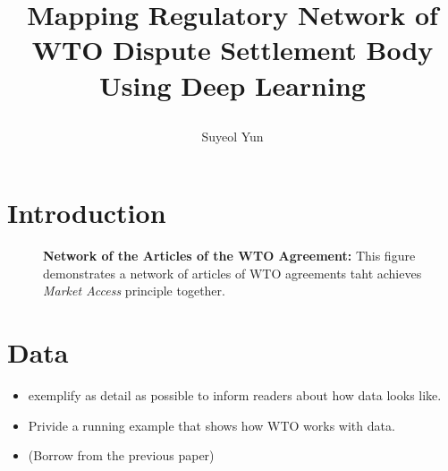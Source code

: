 \documentclass[12pt,letterpaper]{article}
\newcommand{\tit}{
\bf 
Mapping Regulatory Network of WTO Dispute Settlement Body Using Deep Learning
}
\newcommand\spacingset[1]{\renewcommand{\baselinestretch}
{#1}\small\normalsize}
\begin{document}
\spacingset{1.25}

\setcounter{page}{0}
\vspace{-.1in}

{\title{
    \tit
  }
  \author{Suyeol Yun
  }
  \maketitle
}

\thispagestyle{empty}
\vspace{-.1in}

\begin{abstract}
  \lipsum[1]
\end{abstract}

\spacingset{1.5} %

% 

\section{Introduction}










\begin{figure}
  \centering{
    
  }
  \caption{{\bf Network of the Articles of the WTO Agreement:} 
  This figure demonstrates a network of articles of WTO agreements
  taht achieves \textit{Market Access} principle together.
  }
  \label{fig:market-aceess_directed}
\end{figure}

\section{Data}

\begin{itemize}
  \item exemplify as detail as possible to inform readers about how data looks like.
  \item Privide a running example that shows how WTO works with data. 
  \item (Borrow from the previous paper)
  
\end{itemize}
\end{document}
